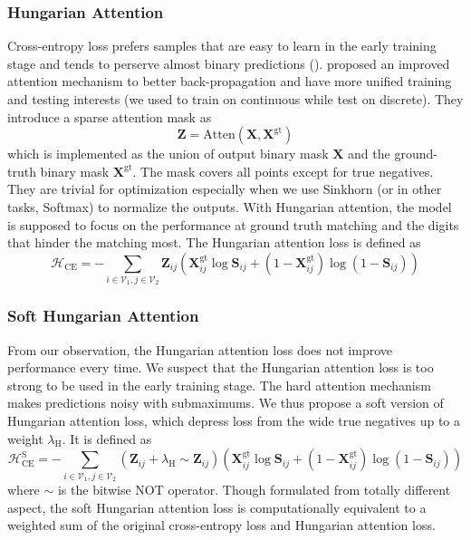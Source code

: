 \documentclass[a4paper]{article}
\begin{document}
\subsubsection{Hungarian Attention}

Cross-entropy loss prefers samples that are easy to learn in the early training stage and tends to perserve almost binary predictions (\cite{cie}). \cite{cie} proposed an improved attention mechanism to better back-propagation and have more unified training and testing interests (we used to train on continuous while test on discrete). They introduce a sparse attention mask as 
$$
\mathbf{Z} = \mathrm{Atten} \left(\mathbf{X}, \mathbf{X}^{\mathrm{gt}}\right)
$$
which is implemented as the union of output binary mask $\mathbf{X}$ and the ground-truth binary mask $\mathbf{X}^{\mathrm{gt}}$. The mask covers all points except for true negatives. They are trivial for optimization especially when we use Sinkhorn (or in other tasks, Softmax) to normalize the outputs. With Hungarian attention, the model is supposed to focus on the performance at ground truth matching and the digits that hinder the matching most. The Hungarian attention loss is defined as 
$$
\mathcal{H}_{\mathrm{CE}} = -\sum_{i\in \mathcal{V}_1, j\in \mathcal{V}_2 } \mathbf{Z}_{ij} \left(\mathbf{X}_{ij}^{\mathrm{gt}} \log\mathbf{S}_{ij} + \left(1-\mathbf{X}_{ij}^{\mathrm{gt}}\right) \log \left(1- \mathbf{S}_{ij}\right) \right)
$$

\subsubsection{Soft Hungarian Attention}
From our observation, the Hungarian attention loss does not improve performance every time. We suspect that the Hungarian attention loss is too strong to be used in the early training stage. The hard attention mechanism makes predictions noisy with submaximums. We thus propose a soft version of Hungarian attention loss, which depress loss from the wide true negatives up to a weight $\lambda_{\mathrm{H}}$. It is defined as
$$
\mathcal{H}_{\mathrm{CE}}^\mathrm{S} = -\sum_{i\in \mathcal{V}_1, j\in \mathcal{V}_2 } \left(\mathbf{Z}_{ij} + \lambda_{\mathrm{H}} \sim \mathbf{Z}_{ij}\right) \left(\mathbf{X}_{ij}^{\mathrm{gt}} \log\mathbf{S}_{ij} + \left(1-\mathbf{X}_{ij}^{\mathrm{gt}}\right) \log \left(1- \mathbf{S}_{ij}\right) \right)
$$
where $\sim$ is the bitwise NOT operator. Though formulated from totally different aspect, the soft Hungarian attention loss is computationally equivalent to a weighted sum of the original cross-entropy loss and Hungarian attention loss.
\end{document}
